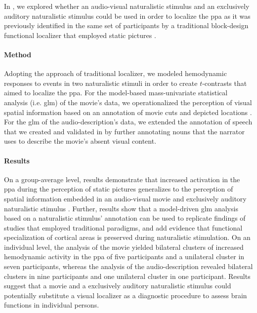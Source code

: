 
In \citet{haeusler2022processing}, we explored whether an audio-visual
naturalistic stimulus and an exclusively auditory naturalistic stimulus could be
used in order to localize the \ac{ppa} as it was previously identified in the
same set of participants by a traditional block-design functional localizer that
employed static pictures \citep{sengupta2016extension}.


\paragraph{Method}
Adopting the approach of traditional localizer, we modeled hemodynamic responses
to events in two naturalistic stimuli in order to create $t$-contrasts that
aimed to localize the \ac{ppa}.
For the model-based mass-univariate statistical analysis (i.e. \ac{glm}) of the
movie's data, we operationalized the perception of visual spatial information
based on an annotation of movie cuts and depicted locations
\citep{haeusler2016cutanno}.
For the \ac{glm} of the audio-description's data, we extended the annotation of
speech that we created and validated in \citep{haeusler2021speechanno} by
further annotating nouns that the narrator uses to describe the movie's absent
visual content.


\paragraph{Results}
On a group-average level, results demonstrate that increased activation in the
\ac{ppa} during the perception of static pictures generalizes to the perception
of spatial information embedded in an audio-visual movie and exclusively
auditory naturalistic stimulus \citep{haeusler2022processing}.
Further, results show that a model-driven \ac{glm} analysis based on a
naturalistic stimulus' annotation can be used to replicate findings of studies
that employed traditional paradigms, and add evidence
\citep[cf.][]{bartels2004mapping} that functional specialization of cortical
areas is preserved during naturalistic stimulation.
On an individual level, the analysis of the movie yielded bilateral clusters of
increased hemodynamic activity in the \ac{ppa} of five participants and a
unilateral cluster in seven participants, whereas the analysis of the
audio-description revealed bilateral clusters in nine participants and one
unilateral cluster in one participant.
Results suggest that a movie and a exclusively auditory naturalistic stimulus
could potentially substitute a visual localizer as a diagnostic procedure to
assess brain functions in individual persons.


